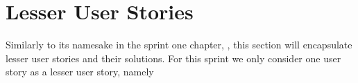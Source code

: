 \section{Lesser User Stories}
Similarly to its namesake in the sprint one chapter, , this section will encapsulate lesser user stories and their solutions.
For this sprint we only consider one user story as a lesser user story, namely 
